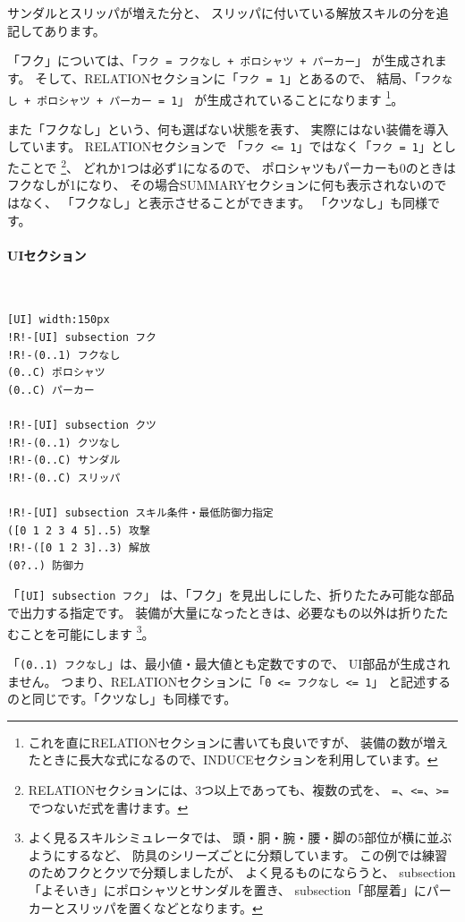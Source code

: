 \documentclass[dvipdfmx]{jsarticle}
\begin{document}
サンダルとスリッパが増えた分と、
スリッパに付いている解放スキルの分を追記してあります。

「フク」については、「\texttt{フク = フクなし + ポロシャツ + パーカー}」
が生成されます。
そして、RELATIONセクションに「\texttt{フク = 1}」とあるので、
結局、「\texttt{フクなし + ポロシャツ + パーカー = 1}」
が生成されていることになります%
\footnote{
これを直にRELATIONセクションに書いても良いですが、
装備の数が増えたときに長大な式になるので、INDUCEセクションを利用しています。
}。

また「フクなし」という、何も選ばない状態を表す、
実際にはない装備を導入しています。
RELATIONセクションで
「\texttt{フク <= 1}」ではなく「\texttt{フク = 1}」としたことで%
\footnote{
RELATIONセクションには、3つ以上であっても、複数の式を、
\texttt{=}、\texttt{<=}、\texttt{>=}
でつないだ式を書けます。
}、
どれか1つは必ず1になるので、
ポロシャツもパーカーも0のときはフクなしが1になり、
その場合SUMMARYセクションに何も表示されないのではなく、
「フクなし」と表示させることができます。
%
「クツなし」も同様です。

\paragraph{UIセクション}~\medskip
{\footnotesize\begin{mdframed}\begin{Verbatim}[commandchars=!<>]
[UI] width:150px
!R!-[UI] subsection フク
!R!-(0..1) フクなし
(0..C) ポロシャツ
(0..C) パーカー

!R!-[UI] subsection クツ
!R!-(0..1) クツなし
!R!-(0..C) サンダル
!R!-(0..C) スリッパ

!R!-[UI] subsection スキル条件・最低防御力指定
([0 1 2 3 4 5]..5) 攻撃
!R!-([0 1 2 3]..3) 解放
(0?..) 防御力
\end{Verbatim}
\end{mdframed}}
\medskip

「\texttt{[UI] subsection フク}」
は、「フク」を見出しにした、折りたたみ可能な部品で出力する指定です。
装備が大量になったときは、必要なもの以外は折りたたむことを可能にします%
\footnote{
よく見るスキルシミュレータでは、
頭・胴・腕・腰・脚の5部位が横に並ぶようにするなど、
防具のシリーズごとに分類しています。
この例では練習のためフクとクツで分類しましたが、
よく見るものにならうと、
subsection「よそいき」にポロシャツとサンダルを置き、
subsection「部屋着」にパーカーとスリッパを置くなどとなります。
}。

「\texttt{(0..1) フクなし}」は、最小値・最大値とも定数ですので、
UI部品が生成されません。
つまり、RELATIONセクションに「\texttt{0 <= フクなし <= 1}」
と記述するのと同じです。「クツなし」も同様です。
\end{document}
